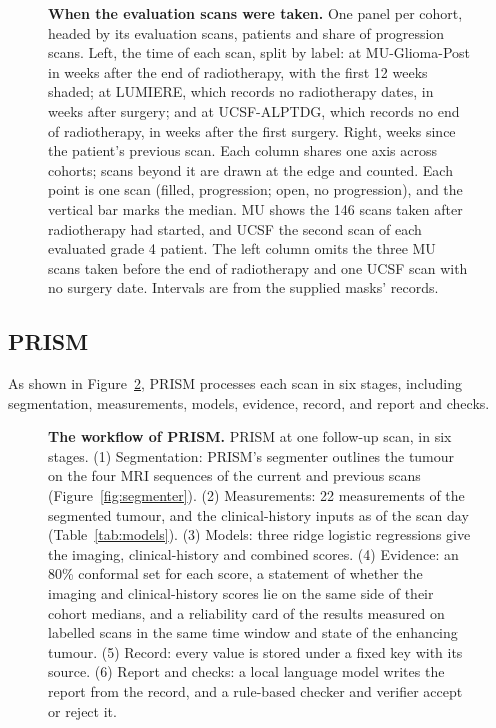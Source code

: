 \documentclass[largeformat]{interact} %
\begin{document}
\begin{figure}[!htbp]
\centering
{}
\vspace{-2mm}
\caption{\textbf{When the evaluation scans were taken.} One panel per cohort, headed by its evaluation scans,
patients and share of progression scans. Left, the time of each scan, split by label: at MU-Glioma-Post in weeks
after the end of radiotherapy, with the first 12 weeks shaded; at LUMIERE, which records no radiotherapy dates, in
weeks after surgery; and at UCSF-ALPTDG, which records no end of radiotherapy, in weeks after the first surgery.
Right, weeks since the patient's previous scan. Each column shares one axis across cohorts; scans beyond it are drawn
at the edge and counted. Each point is one scan (filled, progression; open, no progression), and the vertical bar
marks the median. MU shows the 146 scans taken after radiotherapy had started, and UCSF the second scan of each evaluated grade 4 patient.
The left column omits the three MU scans taken before the end of radiotherapy and one UCSF scan with no surgery date.
Intervals are from the supplied masks' records.}
\label{fig:cohorts}
\end{figure}

\subsection{PRISM}\label{sec:2.2}

As shown in Figure~\ref{fig:stages}, PRISM processes each scan in six stages, including segmentation, measurements, models, evidence, record, and report and checks.

\begin{figure}[!htbp]
\centering
{}
\vspace{-2mm}
\caption{\textbf{The workflow of PRISM.} PRISM at one follow-up scan, in six stages. (1) Segmentation: PRISM's
segmenter outlines the tumour on the four MRI sequences of the current and previous scans
(Figure~\ref{fig:segmenter}). (2) Measurements: 22 measurements of the segmented tumour, and the clinical-history inputs
as of the scan day (Table~\ref{tab:models}). (3) Models: three ridge logistic regressions give the imaging,
clinical-history and combined scores. (4) Evidence: an 80\% conformal set for each score, a statement of whether the
imaging and clinical-history scores lie on the same side of their cohort medians, and a reliability card of the
results measured on labelled scans in the same time window and state of the enhancing tumour.
(5) Record: every value is stored under a fixed key with its source. (6) Report and checks: a local language model
writes the report from the record, and a rule-based checker and verifier accept or reject it.}
\label{fig:stages}
\end{figure}
\end{document}
